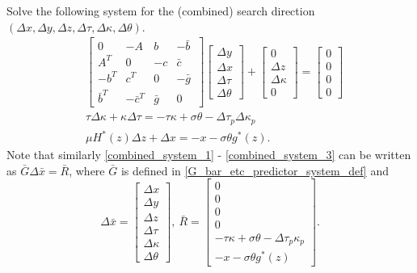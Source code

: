 \documentclass[10pt]{article}
\theoremstyle{definition}
\theoremstyle{plain}
\begin{document}
Solve the following system for the (combined) search direction $(\Delta x, \Delta y, \Delta z, \Delta \tau, \Delta \kappa, \Delta \theta)$.
\begin{align}
& \begin{bmatrix}
0 & -A & b & -\bar b\ \\ 
A^T & 0 & -c & \bar c \\
-b^T & c^T& 0 & -\bar g \\
\bar b^T & -\bar c^T & \bar g & 0
\end{bmatrix}
\begin{bmatrix}
\Delta y \\ \Delta x \\ \Delta \tau \\ \Delta \theta
\end{bmatrix} + 
\begin{bmatrix}
0 \\ \Delta z \\ \Delta \kappa \\ 0 
\end{bmatrix} = \begin{bmatrix}
0\\0\\0\\0
\end{bmatrix} \label{combined_system_1}\\[1ex]
& \tau \Delta \kappa + \kappa \Delta \tau = - \tau \kappa + \sigma \theta - \Delta \tau_p \Delta \kappa_p \label{combined_system_2}\\[1ex]
& \mu H^*(z)\Delta z + \Delta x = -x - \sigma \theta g^*(z). \label{combined_system_3}
\end{align}
Note that similarly \eqref{combined_system_1} - \eqref{combined_system_3} can be written as $\bar G \Delta \bar x = \bar R$, where $\bar G$ is defined in \eqref{G_bar_etc_predictor_system_def} and 
\[\Delta \bar x =  \begin{bmatrix}
\Delta{x}\\ \Delta{y}\\ \Delta{z}\\ \Delta{\tau}\\ \Delta{\kappa}\\ \Delta{\theta}
\end{bmatrix},\ \bar R = \begin{bmatrix}
0\\0\\0\\0\\-\tau\kappa + \sigma\theta - \Delta\tau_p\kappa_p \\[0.8ex] -x - \sigma\theta g^*(z)
	\end{bmatrix}. \]
\end{document}
